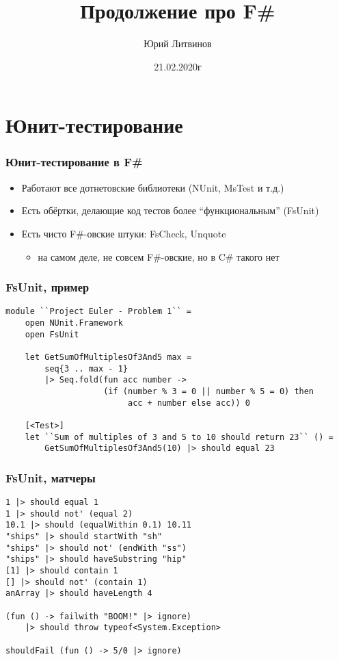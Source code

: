 \documentclass[xetex,mathserif,serif]{beamer}
\title{Продолжение про F\#}
\author{Юрий Литвинов}
\date{21.02.2020г}
\begin{document}
	
	\frame{\titlepage}

	\section{Юнит-тестирование}

	\begin{frame}
		\frametitle{Юнит-тестирование в F\#}
		\begin{itemize}
			\item Работают все дотнетовские библиотеки (NUnit, MsTest и т.д.)
			\item Есть обёртки, делающие код тестов более ``функциональным'' (FsUnit)
			\item Есть чисто F\#-овские штуки: FsCheck, Unquote 
			\begin{itemize}
				\item на самом деле, не совсем F\#-овские, но в C\# такого нет
			\end{itemize}
		\end{itemize}
	\end{frame}

	\begin{frame}[fragile]
		\frametitle{FsUnit, пример}
		\begin{verbatim}
module ``Project Euler - Problem 1`` =
    open NUnit.Framework
    open FsUnit

    let GetSumOfMultiplesOf3And5 max =
        seq{3 .. max - 1} 
        |> Seq.fold(fun acc number ->
                    (if (number % 3 = 0 || number % 5 = 0) then
                         acc + number else acc)) 0

    [<Test>]
    let ``Sum of multiples of 3 and 5 to 10 should return 23`` () =
        GetSumOfMultiplesOf3And5(10) |> should equal 23
		\end{verbatim}
	\end{frame}

	\begin{frame}[fragile]
		\frametitle{FsUnit, матчеры}
		\begin{verbatim}
1 |> should equal 1
1 |> should not' (equal 2)
10.1 |> should (equalWithin 0.1) 10.11
"ships" |> should startWith "sh"
"ships" |> should not' (endWith "ss")
"ships" |> should haveSubstring "hip"
[1] |> should contain 1
[] |> should not' (contain 1)
anArray |> should haveLength 4

(fun () -> failwith "BOOM!" |> ignore) 
    |> should throw typeof<System.Exception>

shouldFail (fun () -> 5/0 |> ignore)
		\end{verbatim}
	\end{frame}
\end{document}
